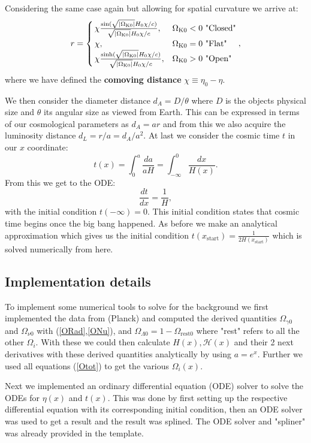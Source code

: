 \documentclass[%
reprint,
 amsmath,amssymb,
 aps,
]{revtex4-2}
\newcommand{\Hp}{\mathcal{H}}
\begin{document}
Considering the same case again but allowing for spatial curvature we arrive at:
\[
r=
\begin{cases}
	\,\chi\frac{\sin(\sqrt{\left|\Omega_{\text K0}\right|}H_0\chi/c)}{\sqrt{\left|\Omega_{\text K0}\right|}H_0\chi/c},& \Omega_{\text K0}<0~\text{"Closed"}\\
	\,\chi, & \Omega_{\text K0}=0~\text{"Flat"}\\
	\,\chi\frac{\sinh(\sqrt{\left|\Omega_{\text K0}\right|}H_0\chi/c)}{\sqrt{\left|\Omega_{\text K0}\right|}H_0\chi/c},& \Omega_{\text K0}>0~\text{"Open"}
\end{cases},
\]
where we have defined the \textbf{comoving distance} $\chi\equiv\eta_0-\eta$. 

We then consider the diameter distance $d_A=D/\theta$ where $D$ is the objects physical size and $\theta$ its angular size as viewed from Earth. This can be expressed in terms of our cosmological parameters as $d_A=ar$ and from this we also acquire the  luminosity distance $d_L=r/a=d_A/a^2$. At last we consider the cosmic time $t$ in our $x$ coordinate:
\[t(x)=\int_0^a\frac{da}{aH}=\int_{-\infty}^0\frac{dx}{H(x)}.\]
From this we get to the ODE:
\begin{equation}
	\frac{dt}{dx}=\frac{1}{H}, \label{dtdx}
\end{equation}
with the initial condition $t(-\infty)=0$. This initial condition states that cosmic time begins once the big bang happened. As before we make an analytical approximation which gives us the initial condition $t(x_\text{start})=\frac{1}{2H(x_\text{start})}$ which is solved numerically from here.

\subsection{Implementation details}

To implement some numerical tools to solve for the background we first implemented the data from (Planck) and computed the derived quantities $\Omega_{\gamma0}$ and $\Omega_{\nu0}$ with (\ref{ORad},\ref{ONu}), and $\Omega_{\Lambda0}=1-\Omega_\text{rest0}$ where "rest" refers to all the other $\Omega_i$. With these we could then calculate $H(x),\Hp(x)$ and their 2 next derivatives with these derived quantities analytically by using $a=e^x$. Further we used all equations (\ref{Otot}) to get the various $\Omega_i(x)$.  

Next we implemented an ordinary differential equation (ODE) solver to solve the ODEs for $\eta(x)$ and $t(x)$. This was done by first setting up the respective differential equation with its corresponding initial condition, then an ODE solver was used to get a result and the result was splined. The ODE solver and "spliner" was already provided in the template. 
\end{document}

